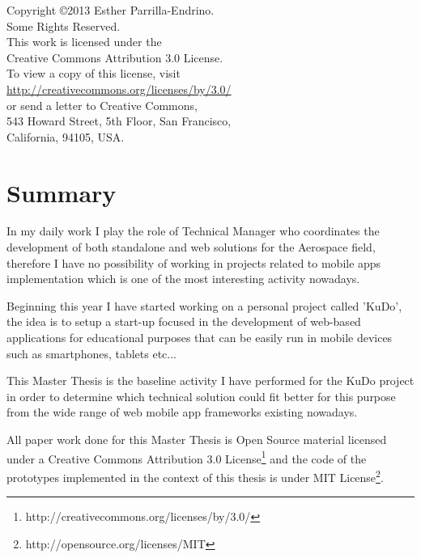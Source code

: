 \documentclass[a4paper,12pt]{book}
\begin{document}
\newpage
\thispagestyle{empty}
\vspace{5cm}
\begin{flushright}
\begin{large}
Copyright \copyright 2013 Esther Parrilla-Endrino.\\
Some Rights Reserved.\\
This work is licensed under the\\
Creative Commons Attribution 3.0 License.\\
To view a copy of this license, visit\\
\url{http://creativecommons.org/licenses/by/3.0/}\\
or send a letter to Creative Commons,\\
543 Howard Street, 5th Floor, San Francisco,\\
California, 94105, USA.\\
\end{large}
\end{flushright}

\newpage

\tableofcontents  %

\renewcommand{\refname}{Bibliography}
\addtolength{\parskip}{\baselineskip}


\chapter*{Summary}
\label{chap:summary}

In my daily work I play the role of Technical Manager who coordinates the development of both standalone and web solutions for the Aerospace field, therefore I have no possibility of working in projects related to mobile apps implementation which is one of the most interesting activity nowadays.

Beginning this year I have started working on a personal project called 'KuDo', the idea is to setup a start-up focused in the development of web-based applications for educational purposes that can be easily run in mobile devices such as smartphones, tablets etc...

This Master Thesis is the baseline activity I have performed for the KuDo project in order to determine which technical solution could fit better for this purpose from the wide range of web mobile app frameworks existing nowadays.

All paper work done for this Master Thesis is Open Source material licensed under a Creative Commons Attribution 3.0 License\footnote{http://creativecommons.org/licenses/by/3.0/} and the code of the prototypes implemented in the context of this thesis is under MIT License\footnote{http://opensource.org/licenses/MIT}.
\end{document}
